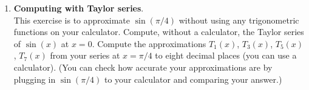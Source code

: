 \documentclass[11pt,a4paper]{scrartcl}
\begin{document}
\begin{enumerate}
	\item \textbf{Computing with Taylor series}.\\
	This exercise is to approximate $\sin(\pi/4)$ without 
	using any trigonometric functions on your calculator.
    Compute, without a calculator, 
 	the Taylor series of
		$\sin (x)$ at $x=0$.
		Compute the approximations $T_1(x)$, $T_3(x)$, $T_5(x)$, $T_7(x)$ from your
		series at $x = \pi/4$ to eight decimal places (you can use a calculator).
		(You can check how accurate your approximations are by plugging in 
		$\sin(\pi/4)$ to your calculator and comparing your answer.)
	
\end{enumerate}
\end{document}
